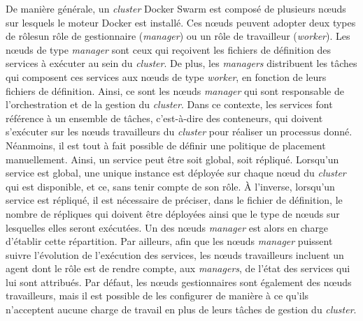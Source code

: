 De manière générale, un \textit{cluster} Docker Swarm est composé de plusieurs n\oe{}uds sur lesquels le moteur Docker est installé. Ces n\oe{}uds peuvent adopter deux types de rôles\textemdash un rôle de gestionnaire (\textit{manager}) ou un rôle de travailleur (\textit{worker}). Les n\oe{}uds de type \textit{manager} sont ceux qui reçoivent les fichiers de définition des services à exécuter au sein du \textit{cluster}. De plus, les \textit{managers} distribuent les tâches qui composent ces services aux n\oe{}uds de type \textit{worker}, en fonction de leurs fichiers de définition. Ainsi, ce sont les n\oe{}uds \textit{manager} qui sont responsable de l'orchestration et de la gestion du \textit{cluster}. Dans ce contexte, les services font référence à un ensemble de tâches, c'est-à-dire des conteneurs, qui doivent s'exécuter sur les n\oe{}uds travailleurs du \textit{cluster} pour réaliser un processus donné. Néanmoins, il est tout à fait possible de définir une politique de placement manuellement. Ainsi, un service peut être soit global, soit répliqué. Lorsqu'un service est global, une unique instance est déployée sur chaque n\oe{}ud du \textit{cluster} qui est disponible, et ce, sans tenir compte de son rôle.  À l'inverse, lorsqu'un service est répliqué, il est nécessaire de préciser, dans le fichier de définition, le nombre de répliques qui doivent être déployées ainsi que le type de n\oe{}uds sur lesquelles elles seront exécutées. Un des n\oe{}uds \textit{manager} est alors en charge d'établir cette répartition. Par ailleurs, afin que les n\oe{}uds \textit{manager} puissent suivre l'évolution de l'exécution des services, les n\oe{}uds travailleurs incluent un agent dont le rôle est de rendre compte, aux \textit{managers}, de l'état des services qui lui sont attribués. Par défaut, les n\oe{}uds gestionnaires sont également des n\oe{}uds travailleurs, mais il est possible de les configurer de manière à ce qu'ils n'acceptent aucune charge de travail en plus de leurs tâches de gestion du \textit{cluster}.

